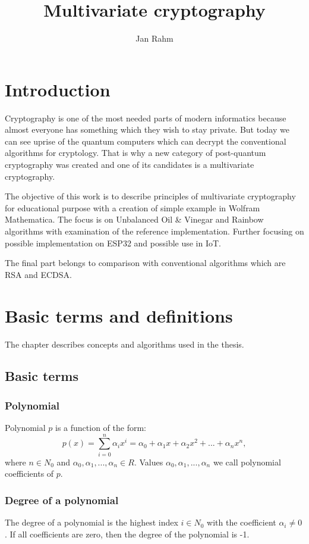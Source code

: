 \documentclass[thesis=M,english]{FITthesis}[2019/12/23]
\title{Multivariate cryptography}
\author{Jan Rahm} %
\begin{document}

\chapter{Introduction}
Cryptography is one of the most needed parts of modern informatics because almost everyone has something which they wish to stay private. But today we can see uprise of the quantum computers which can decrypt the conventional algorithms for cryptology. That is why a new category of post-quantum cryptography was created and one of its candidates is a multivariate cryptography.

The objective of this work is to describe principles of multivariate cryptography for educational purpose with a creation of simple example in Wolfram Mathematica. The focus is on Unbalanced Oil \& Vinegar and Rainbow algorithms with examination of the reference implementation. Further focusing on possible implementation on ESP32 and possible use in IoT.

The final part belongs to comparison with conventional algorithms which are RSA and ECDSA.

\chapter{Basic terms and definitions}
The chapter describes concepts and algorithms used in the thesis.

\section{Basic terms}
\subsection{Polynomial}
Polynomial $p$ is a function of the form:
\[
p(x) = \sum\limits_{i=0}^n {\alpha_ix^i} = \alpha_0 + \alpha_1x + \alpha_2x^2 + ... + \alpha_nx^n,
\]
where $n \in N_0$ and $\alpha_0, \alpha_1, ..., \alpha_n \in R$. Values $\alpha_0, \alpha_1, ..., \alpha_n$ we call polynomial coefficients of $p$.

\subsection{Degree of a polynomial}
The degree of a polynomial is the highest index $i \in N_0$ with the coefficient $\alpha_i \ne 0$. If all coefficients are zero, then the degree of the polynomial is -1.
\end{document}
